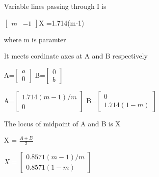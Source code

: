 \documentclass{beamer}
\begin{document}
\begin{frame}
Variable lines passing through I is




 $\begin{bmatrix}
 m &-1 
\end{bmatrix}$X =1.714(m-1)


where m is paramter


It meets cordinate axes at A and B respectively
 
A=$\begin{bmatrix}
  
a\\
0
    \end{bmatrix}$
B=$\begin{bmatrix}
  
0\\
b
    \end{bmatrix}$

A=$\begin{bmatrix}
  
1.714(m-1)/m\\
0
    \end{bmatrix}$
B=$\begin{bmatrix}
  
0\\
1.714(1-m)
    \end{bmatrix}$
    
The locus of midpoint of A and B is X
    
    

X = $\frac{A+B}{2}$



$
X=
\begin{bmatrix}
0.8571(m-1)/{m}\\
0.8571(1-m)
    \end{bmatrix}$
\end{frame}
\end{document}
